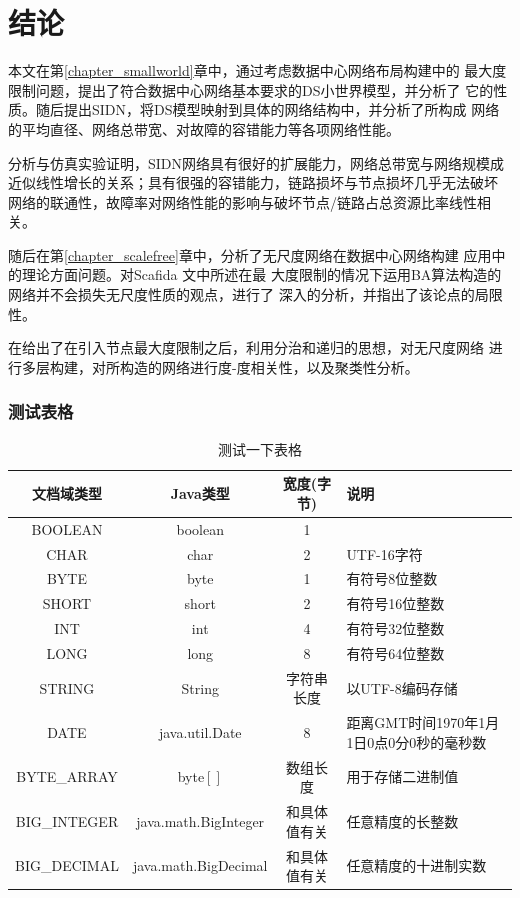 \documentclass[oneside, phd]{njuthesis}
\begin{document}
\chapter{结论}\label{chapter_concludes}

本文在第\ref{chapter_smallworld}章中，通过考虑数据中心网络布局构建中的
最大度限制问题，提出了符合数据中心网络基本要求的DS小世界模型，并分析了
它的性质。随后提出SIDN，将DS模型映射到具体的网络结构中，并分析了所构成
网络的平均直径、网络总带宽、对故障的容错能力等各项网络性能。

分析与仿真实验证明，SIDN网络具有很好的扩展能力，网络总带宽与网络规模成
近似线性增长的关系；具有很强的容错能力，链路损坏与节点损坏几乎无法破坏
网络的联通性，故障率对网络性能的影响与破坏节点/链路占总资源比率线性相关。

随后在第\ref{chapter_scalefree}章中，分析了无尺度网络在数据中心网络构建
应用中的理论方面问题。对Scafida \cite{gyarmati2010scafida}文中所述在最
大度限制的情况下运用BA算法构造的网络并不会损失无尺度性质的观点，进行了
深入的分析，并指出了该论点的局限性。

在给出了在引入节点最大度限制之后，利用分治和递归的思想，对无尺度网络
进行多层构建，对所构造的网络进行度-度相关性，以及聚类性分析。


\subsection{测试表格}

\begin{table}
  \centering
  \begin{tabular}{cccp{38mm}}
    \toprule
    \textbf{文档域类型} & \textbf{Java类型} & \textbf{宽度(字节)} & \textbf{说明} \\
    \midrule
    BOOLEAN  & boolean &  1  & \\
    CHAR     & char    &  2  & UTF-16字符 \\
    BYTE     & byte    &  1  & 有符号8位整数 \\
    SHORT    & short   &  2  & 有符号16位整数 \\
    INT      & int     &  4  & 有符号32位整数 \\
    LONG     & long    &  8  & 有符号64位整数 \\
    STRING   & String  &  字符串长度  & 以UTF-8编码存储 \\
    DATE     & java.util.Date & 8 & 距离GMT时间1970年1月1日0点0分0秒的毫秒数 \\
    BYTE\_ARRAY & byte$[]$ & 数组长度 & 用于存储二进制值 \\
    BIG\_INTEGER & java.math.BigInteger & 和具体值有关 & 任意精度的长整数 \\
    BIG\_DECIMAL & java.math.BigDecimal & 和具体值有关 & 任意精度的十进制实数 \\
    \bottomrule
  \end{tabular}
  \caption{测试一下表格}\label{table:test}
\end{table}
\end{document}
